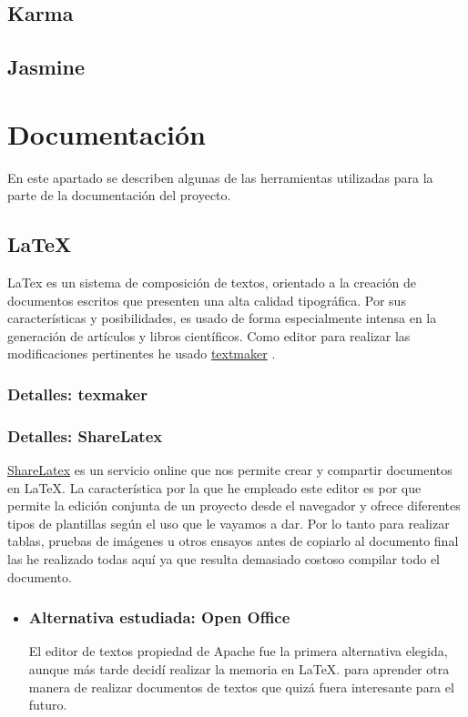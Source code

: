 \subsection{Karma}\label{karma}


\subsection{Jasmine}\label{jasmine}


\section{Documentación}\label{docs}
En este apartado se describen algunas de las herramientas utilizadas para la parte de la documentación del proyecto.

 \subsection{La\TeX}\label{docs_latex}
  LaTex es un sistema de composición de textos, orientado a la creación de documentos escritos que presenten una alta calidad tipográfica. Por sus características y posibilidades, es usado de forma especialmente intensa en la generación de artículos y libros científicos. Como editor para realizar las modificaciones pertinentes he usado \hyperlink{http://www.xm1math.net/texmaker/}{textmaker} .
   \subsubsection{Detalles: texmaker}
  
   \subsubsection{Detalles: ShareLatex}
    \hyperlink{https://es.sharelatex.com/}{ShareLatex}  es un servicio online que nos permite crear y compartir documentos en La\TeX. La característica por la que he empleado este editor es por que  permite la edición conjunta de un proyecto desde el navegador y ofrece diferentes tipos de plantillas según el uso que le vayamos a dar. Por lo tanto para realizar tablas, pruebas de imágenes u otros ensayos antes de copiarlo al documento final las he realizado todas aquí ya que resulta demasiado costoso compilar todo el documento.
  
 \begin{itemize}
 	\item 	\subsubsection{Alternativa estudiada: Open Office}\label{openoffice}
El editor de textos propiedad de Apache fue la primera alternativa elegida, aunque más tarde decidí realizar la memoria en La\TeX. para aprender otra manera de realizar documentos de textos que quizá fuera interesante para el futuro.
\end{itemize}

